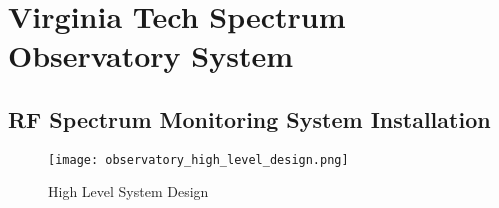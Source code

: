 \documentclass[12pt,sts]{report}
\begin{document}


\section{Virginia Tech Spectrum Observatory System}

\subsection{RF Spectrum Monitoring System Installation}

\begin{figure}[h!]
  \centering
    \texttt{[image: observatory\_high\_level\_design.png]}
	\caption{High Level System Design}
\end{figure}
\end{document}
